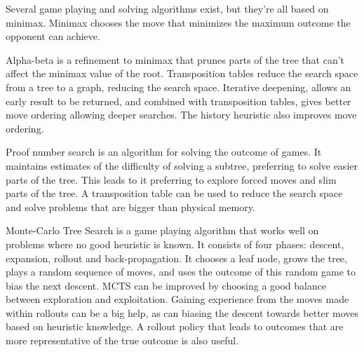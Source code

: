 Several game playing and solving algorithms exist, but they're all based on minimax. Minimax chooses the move that minimizes the maximum outcome the opponent can achieve.

Alpha-beta is a refinement to minimax that prunes parts of the tree that can't affect the minimax value of the root. Transposition tables reduce the search space from a tree to a graph, reducing the search space. Iterative deepening, allows an early result to be returned, and combined with transposition tables, gives better move ordering allowing deeper searches. The history heuristic also improves move ordering.

Proof number search is an algorithm for solving the outcome of games. It maintains estimates of the difficulty of solving a subtree, preferring to solve easier parts of the tree. This leads to it preferring to explore forced moves and slim parts of the tree. A transposition table can be used to reduce the search space and solve problems that are bigger than physical memory.

Monte-Carlo Tree Search is a game playing algorithm that works well on problems where no good heuristic is known. It consists of four phases: descent, expansion, rollout and back-propagation. It chooses a leaf node, grows the tree, plays a random sequence of moves, and uses the outcome of this random game to bias the next descent. MCTS can be improved by choosing a good balance between exploration and exploitation. Gaining experience from the moves made within rollouts can be a big help, as can biasing the descent towards better moves based on heuristic knowledge. A rollout policy that leads to outcomes that are more representative of the true outcome is also useful.

